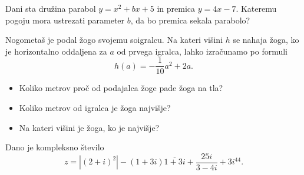 \documentclass[addpoints]{exam}
\begin{document}
\begin{questions}

    \question[5]
        Dani sta družina parabol $y=x^2+bx+5$ in premica $y=4x-7$.
        Kateremu pogoju mora ustrezati parameter $b$, da bo premica sekala parabolo?




    \question[4]
           Nogometaš je podal žogo svojemu soigralcu.
           Na kateri višini $h$ se nahaja žoga, ko je horizontalno oddaljena za $a$ od prvega igralca, 
           lahko izračunamo po formuli $$ h(a)=-\dfrac{1}{10}a^2+2a.$$
            
            \begin{itemize}
                \item Koliko metrov proč od podajalca žoge pade žoga na tla?
                \item Koliko metrov od igralca je žoga najvišje?
                \item Na kateri višini je žoga, ko je najvišje?
            \end{itemize}




    \question
        Dano je kompleksno število $$ z=\left|\left(2+i\right)^2\right|-\left(1+3i\right)\overline{1+3i}+\dfrac{25i}{3-4i}+3i^{44}. $$ 

\end{questions}
\end{document}
